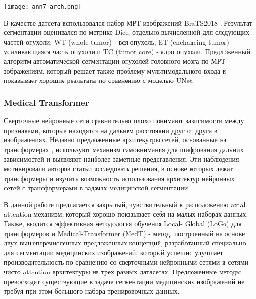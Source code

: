 \begin{minipage}{1.0\linewidth}
    \begin{center}
        \texttt{[image: ann7\_arch.png]} \\
    \end{center}
\end{minipage}


В качестве датсета использовался набор МРТ-изображений BraTS2018 \cite{BraTS}. Результат сегментации  оценивался по метрике Dice, отдельно вычисленной
для следующих частей опухоли: WT (whole tumor) -  вся опухоль, ET (enchancing tumor) - 
усиливающаяся часть опухоли и TC (tumor core) - ядро опухоли. Предложенный алгоритм автоматической сегментации опухолей головного мозга по МРТ-зображениям, который решает также
проблему мультимодального входа и показывает хорошие резльтаты по сравнению с моделью UNet.

\subsubsection*{Medical Transformer}

Сверточные нейронные сети сравнительно плохо понимают зависимости между признаками, которые находятся на дальнем расстоянии друг от друга
в изображениях. Недавно предложенные архитекутры сетей, основанные на
трансформерах \cite{Transformers}, используют механизм самовнимания \cite{SelfAttention} для шифрования дальних
зависимостей и выявляют наиболее заметные представления. Эти наблюдения
мотивировали авторов статьи исследовать решения, в основе которых лежат
трансформеры и изучить возможность использования архитектур нейронных
сетей с трансформерами в задачах медицинской сегментации. \cite{MedT} \par 
В данной работе предлагается закрытый, чувствительный к расположению axial 
attention механизм, который хорошо показывает себя на малых
наборах данных. Также, вводится эффективная методология обучения Local-
Global (LoGo) для трансформеров и Medical-Transformer (MedT) - метод,
построенный на основе двух вышеперечисленных предложенных концепций,
разработанный специально для сегментации медицинских изображений, который успешно улучшает производительность по сравнению со сверточными
нейронными сетями и сетями чисто attention архитектуры на трех разных датасетах. Предложенные методы
превосходят существующие в задаче сегментации медицинских изображений
не требуя при этом большого набора тренировочных данных.\\


